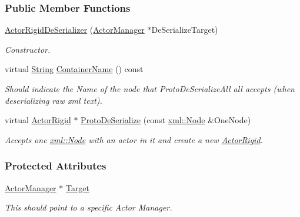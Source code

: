\subsubsection*{Public Member Functions}
\begin{DoxyCompactItemize}
\item 
\hyperlink{classMezzanine_1_1ActorRigidDeSerializer_a97354288510148767134246ac26d319b}{ActorRigidDeSerializer} (\hyperlink{classMezzanine_1_1ActorManager}{ActorManager} $\ast$DeSerializeTarget)
\begin{DoxyCompactList}\small\item\em Constructor. \item\end{DoxyCompactList}\item 
virtual \hyperlink{namespaceMezzanine_acf9fcc130e6ebf08e3d8491aebcf1c86}{String} \hyperlink{classMezzanine_1_1ActorRigidDeSerializer_a4f28a9c4679891e249f9f5e4381a3f93}{ContainerName} () const 
\begin{DoxyCompactList}\small\item\em Should indicate the Name of the node that ProtoDeSerializeAll all accepts (when deserializing raw xml text). \item\end{DoxyCompactList}\item 
virtual \hyperlink{classMezzanine_1_1ActorRigid}{ActorRigid} $\ast$ \hyperlink{classMezzanine_1_1ActorRigidDeSerializer_aff6fdcd7d7fdbc52e493ba2c8229b2e1}{ProtoDeSerialize} (const \hyperlink{classMezzanine_1_1xml_1_1Node}{xml::Node} \&OneNode)
\begin{DoxyCompactList}\small\item\em Accepts one \hyperlink{classMezzanine_1_1xml_1_1Node}{xml::Node} with an actor in it and create a new \hyperlink{classMezzanine_1_1ActorRigid}{ActorRigid}. \item\end{DoxyCompactList}\end{DoxyCompactItemize}
\subsubsection*{Protected Attributes}
\begin{DoxyCompactItemize}
\item 
\hypertarget{classMezzanine_1_1ActorRigidDeSerializer_a2721883c45e41b5a1b7992feb57750bc}{
\hyperlink{classMezzanine_1_1ActorManager}{ActorManager} $\ast$ \hyperlink{classMezzanine_1_1ActorRigidDeSerializer_a2721883c45e41b5a1b7992feb57750bc}{Target}}
\label{classMezzanine_1_1ActorRigidDeSerializer_a2721883c45e41b5a1b7992feb57750bc}

\begin{DoxyCompactList}\small\item\em This should point to a specific Actor Manager. \item\end{DoxyCompactList}\end{DoxyCompactItemize}


